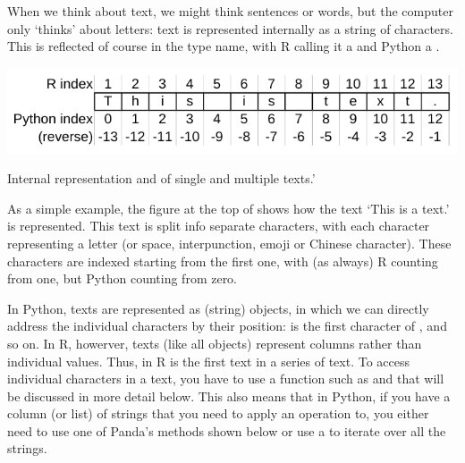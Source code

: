 
When we think about text, we might think sentences or words, but the computer only `thinks' about letters:
text is represented internally as a string of characters.
This is reflected of course in the type name, with R calling it a  and Python a .

\begin{ccsexample}
  \begin{center} \includegraphics[width=.6\textwidth]{chapter10/text.pdf}\end{center}
  

  \caption{Internal representation and of single and multiple texts.'}\label{ex:text}
\end{ccsexample}

As a simple example, the figure at the top of  shows how the text `This is a text.' is represented.
This text is split info separate characters, with each character representing a letter (or space, interpunction, emoji or Chinese character).
These characters are indexed starting from the first one, with (as always) R counting from one, but Python counting from zero.

In Python, texts are represented as  (string) objects, in which we can directly address the individual characters by their position:  is the first character of , and so on.
In R, howerver, texts (like all objects) represent columns rather than individual values.
Thus,  in R is the first text in a series of text.
To access individual characters in a text, you have to use a function such as  and  that will be discussed in more detail below. 
This also means that in Python, if you have a column (or list) of strings that you need to apply an operation to,
you either need to use one of Panda's methods shown below or use a  to iterate over all the strings.

